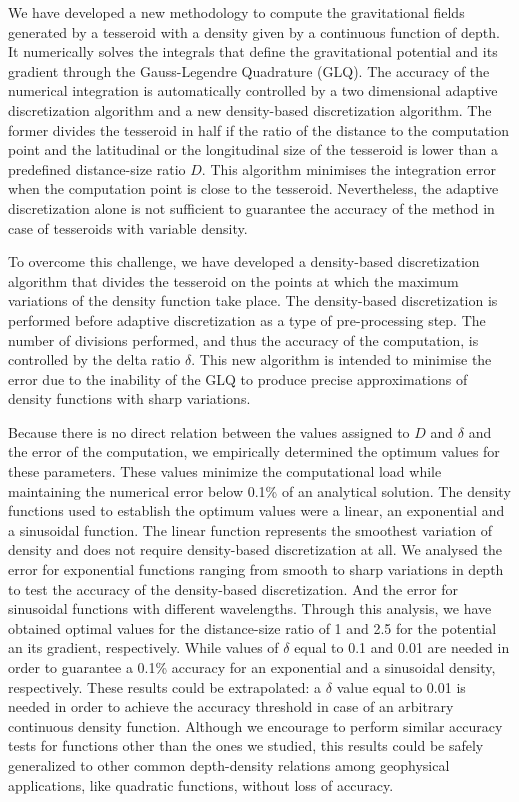 \documentclass[extra, referee]{gji}
\begin{document}
We have developed a new methodology to compute the gravitational fields
generated by a tesseroid with a density given by a continuous function of depth.
It numerically solves the integrals that define the gravitational potential and
its gradient through the Gauss-Legendre Quadrature (GLQ).
The accuracy of the numerical integration is automatically controlled by a two
dimensional adaptive discretization algorithm and a new density-based discretization
algorithm.
The former divides the tesseroid in half if the ratio of the distance to the computation
point and the latitudinal or the longitudinal size of the tesseroid is lower than
a predefined distance-size ratio $D$.
This algorithm minimises the integration error when the computation point is close to
the tesseroid.
Nevertheless, the adaptive discretization alone is not sufficient to guarantee the
accuracy of the method in case of tesseroids with variable density.

To overcome this challenge, we have developed a density-based discretization algorithm
that divides the tesseroid on the points at which the maximum variations of the density
function take place.
The density-based discretization is performed before adaptive discretization as a type
of pre-processing step.
The number of divisions performed, and thus the accuracy of the computation, is
controlled by the delta ratio $\delta$.
This new algorithm is intended to minimise the error due to the inability of
the GLQ to produce precise approximations of density functions with sharp variations.

Because there is no direct relation between the values assigned to $D$ and $\delta$ and
the error of the computation, we empirically determined the optimum values for these
parameters.
These values minimize the computational load while maintaining the numerical error below
0.1\% of an analytical solution.
The density functions used to establish the optimum values were a linear, an exponential
and a sinusoidal function.
The linear function represents the smoothest variation of density and does not require
density-based discretization at all.
We analysed the error for exponential functions ranging from smooth to sharp variations
in depth to test the accuracy of the density-based discretization.
And the error for sinusoidal functions with different wavelengths.
Through this analysis, we have obtained optimal values for the distance-size ratio of
1 and 2.5 for the potential an its gradient, respectively.
While values of $\delta$ equal to 0.1 and 0.01 are needed in order to guarantee a 0.1\%
accuracy for an exponential and a sinusoidal density, respectively.
These results could be extrapolated: a $\delta$ value equal to 0.01 is needed in order
to achieve the accuracy threshold in case of an arbitrary continuous density function.
Although we encourage to perform similar accuracy tests for functions other than the
ones we studied, this results could be safely generalized to other common depth-density
relations among geophysical applications, like quadratic functions, without loss of
accuracy.
\end{document}
